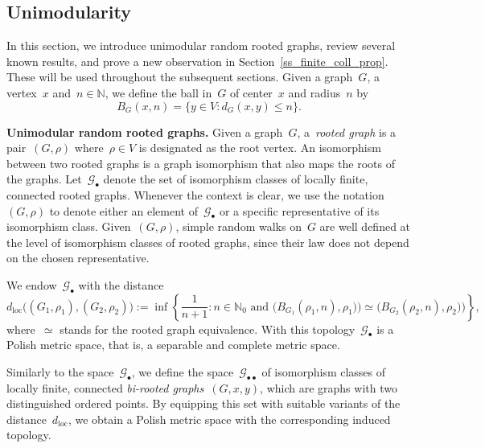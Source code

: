 \documentclass[a4paper,11pt]{article}
\newcommand{\NN}{\mathbb{N}}
\theoremstyle{definition}
\begin{document}
\subsection{Unimodularity}\label{ss_unimodularity}
In this section, we introduce unimodular random rooted graphs, review several known results, and prove a new observation in Section~\ref{ss_finite_coll_prop}. These will be used throughout the subsequent sections. Given a graph~$G$, a vertex~$x$ and~$n \in \NN$, we define the ball in~$G$ of center~$x$ and radius~$n$ by 
\begin{equation*}
B_G(x,n) = \{y \in V: d_G(x,y) \leq n\}.
\end{equation*}

\noindent \textbf{Unimodular random rooted graphs.} Given a graph~$G$, a~\emph{rooted graph} is a pair~$(G, \rho)$ where~$\rho \in V$ is designated as the root vertex. An isomorphism between two rooted graphs is a graph isomorphism that also maps the roots of the graphs. Let~$\mathcal G_\bullet$ denote the set of isomorphism classes of locally finite, connected rooted graphs. Whenever the context is clear, we use the notation~$(G, \rho)$ to denote either an element of~$\mathcal{G}_\bullet$ or a specific representative of its isomorphism class. Given~$(G,\rho)$, simple random walks on~$G$ are well defined at the level of isomorphism classes of rooted graphs, since their law does not depend on the chosen representative.

We endow~$\mathcal G_\bullet$ with the distance
$$ d_\mathrm{loc}\big( (G_1,\rho_1),(G_2,\rho_2) \big) := \inf \left\{ \frac{1}{n+1}: n \in \mathbb N_0 \text{ and } \big(B_{G_1}(\rho_1,n),\rho_1)\big) \simeq \big(B_{G_2}(\rho_2,n),\rho_2)  \big) \right\},$$
where~$\simeq$ stands for the rooted graph equivalence. With this topology~$\mathcal G_\bullet$ is a Polish metric space, that is, a separable and complete metric space.

Similarly to the space~$\mathcal G_{\bullet}$, we define the space~$\mathcal G_{\bullet \bullet}$ of isomorphism classes of locally finite, connected \emph{bi-rooted graphs}~$(G,x,y)$, which are graphs with two distinguished ordered points. By equipping this set with suitable variants of the distance~$d_\mathrm{loc}$, we obtain a Polish metric space with the corresponding induced topology.
\end{document}
